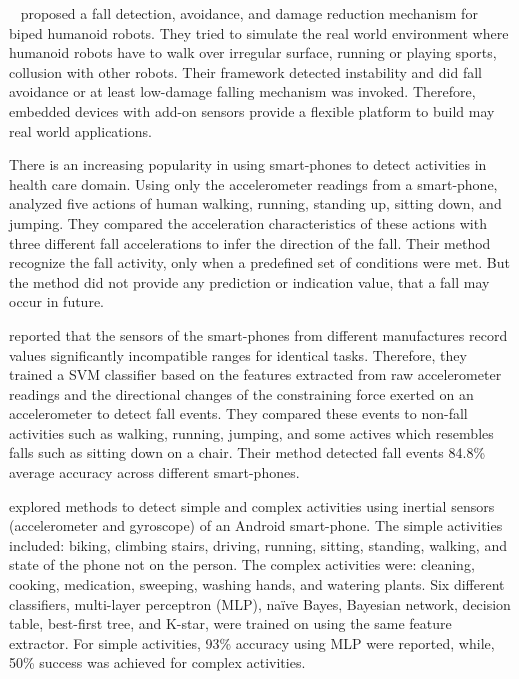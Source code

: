 \documentclass[letterpaper]{article}
\begin{document}
\begin{sloppy}
{~\cite{moya2014fall}} proposed a fall detection, avoidance, and damage 
reduction mechanism for biped humanoid robots. They tried to simulate the real world environment 
where humanoid robots have to walk over irregular surface, running or playing sports, collusion 
with other robots. Their framework detected instability and did fall avoidance or at 
least low-damage falling mechanism was invoked. Therefore, embedded devices  with add-on sensors 
provide a flexible platform to build may real world applications. 


There is an increasing popularity in using smart-phones to detect activities in health care domain. 
Using only the accelerometer readings from a smart-phone, \cite{bai2013recognition} analyzed five 
actions of human walking, running, standing up, sitting down, and jumping. They compared the 
acceleration characteristics of these actions with three different fall accelerations to infer the 
direction of the fall. Their method recognize the fall activity, only when a predefined set of 
conditions were met. But the method did not provide any prediction or indication value, that a fall 
may occur in future. 

\cite{steidl2012fall} reported that the sensors of the smart-phones from different manufactures 
record values significantly incompatible ranges for identical tasks. Therefore, they trained a SVM 
classifier based on the features extracted from raw accelerometer readings and the directional 
changes of the constraining force exerted on an accelerometer to detect fall events. They compared 
these events to non-fall activities such as walking, running, jumping, and some actives which 
resembles falls such as sitting down on a chair. Their method detected fall events 84.8\% average 
accuracy across different smart-phones. 

\cite{DernbachDKTC12} explored methods to detect simple and complex activities using inertial 
sensors (accelerometer and gyroscope) of an Android smart-phone. The simple activities included: 
biking, climbing stairs, driving, running, sitting, standing, walking, and state of the phone not 
on the person. The complex activities were: cleaning, cooking, medication, sweeping, washing hands, 
and watering plants. Six different classifiers, multi-layer  perceptron (MLP), na\"{i}ve  Bayes,  
Bayesian  network,  decision  table,  best-first tree, and  K-star,  were trained on using the same 
feature extractor. For simple activities, 93\% accuracy using MLP were reported, while, 50\% 
success was achieved for complex activities.     



\end{sloppy}
\end{document}
